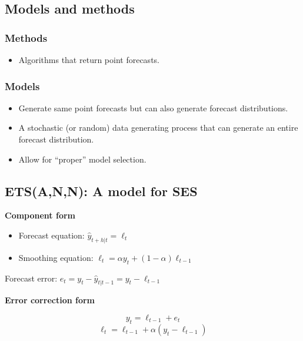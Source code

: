 \documentclass[]{book}
\providecommand{\tightlist}{%
  \setlength{\itemsep}{0pt}\setlength{\parskip}{0pt}}
\begin{document}
\hypertarget{models-and-methods}{%
\subsection{Models and methods}\label{models-and-methods}}

\hypertarget{methods}{%
\subsubsection{Methods}\label{methods}}

\begin{itemize}
\tightlist
\item
  Algorithms that return point forecasts.
\end{itemize}

\hypertarget{models}{%
\subsubsection{Models}\label{models}}

\begin{itemize}
\tightlist
\item
  Generate same point forecasts but can also generate forecast distributions.
\item
  A stochastic (or random) data generating process that can generate an entire forecast distribution.
\item
  Allow for ``proper'' model selection.
\end{itemize}

\hypertarget{etsann-a-model-for-ses}{%
\subsection{ETS(A,N,N): A model for SES}\label{etsann-a-model-for-ses}}

\textbf{Component form}

\begin{itemize}
\item
  Forecast equation: \(\hat{y}_{t+h|t} = \ell_{t}\)
\item
  Smoothing equation: \(\ell_{t} = \alpha y_{t} + (1 - \alpha)\ell_{t-1}\)
\end{itemize}

Forecast error: \(e_t = y_t - \hat{y}_{t|t-1} = y_t - \ell_{t-1}\)

\textbf{Error correction form}

\[y_t = \ell_{t-1} + e_t\]
\[\ell_{t}= \ell_{t-1}+\alpha( y_{t}-\ell_{t-1})\]
\end{document}
